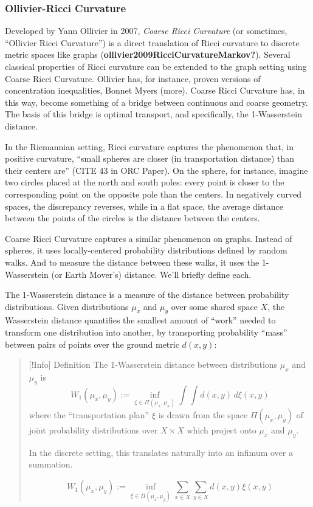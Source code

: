 \documentclass[
]{agujournal2019}
\begin{document}
\subsubsection{Ollivier-Ricci Curvature}\label{ollivier-ricci-curvature}

Developed by Yann Ollivier in 2007, \emph{Coarse Ricci Curvature} (or
sometimes, ``Ollivier Ricci Curvature'') is a direct translation of
Ricci curvature to discrete metric spaces like graphs
(\textbf{ollivier2009RicciCurvatureMarkov?}). Several classical
properties of Ricci curvature can be extended to the graph setting using
Coarse Ricci Curvature. Ollivier has, for instance, proven versions of
concentration inequalities, Bonnet Myers (more). Coarse Ricci Curvature
has, in this way, become something of a bridge between continuous and
coarse geometry. The basis of this bridge is optimal transport, and
specifically, the 1-Wasserstein distance.

In the Riemannian setting, Ricci curvature captures the phenomenon that,
in positive curvature, ``small spheres are closer (in transportation
distance) than their centers are'' (CITE 43 in ORC Paper). On the
sphere, for instance, imagine two circles placed at the north and south
poles: every point is closer to the corresponding point on the opposite
pole than the centers. In negatively curved spaces, the discrepancy
reverses, while in a flat space, the average distance between the points
of the circles is the distance between the centers.

Coarse Ricci Curvature captures a similar phenomenon on graphs. Instead
of spheres, it uses locally-centered probability distributions defined
by random walks. And to measure the distance between these walks, it
uses the 1-Wasserstein (or Earth Mover's) distance. We'll briefly define
each.

The 1-Wasserstein distance is a measure of the distance between
probability distributions. Given distributions \(\mu_{x}\) and
\(\mu_{y}\) over some shared space \(X\), the Wasserstein distance
quantifies the smallest amount of ``work'' needed to transform one
distribution into another, by transporting probability ``mass'' between
pairs of points over the ground metric \(d(x,y)\):

\begin{quote}
{[}!Info{]} Definition The 1-Wasserstein distance between distributions
\(\mu_{x}\) and \(\mu_{y}\) is
\[ W_{1}(\mu_{x},\mu_{y}) := \inf_{\xi \in \Pi(\mu_{x},\mu_{u})} \int \int d(x,y) \, d\xi(x,y) \]
where the ``transportation plan'' \(\xi\) is drawn from the space
\(\Pi(\mu_{x},\mu_{y})\) of joint probability distributions over
\(X \times X\) which project onto \(\mu_{x}\) and \(\mu_{y}\).

In the discrete setting, this translates naturally into an infimum over
a summation.

\[W_{1}(\mu_{x},\mu_{y}) := \inf_{\xi \in \Pi(\mu_{x},\mu_{y})} \sum_{x \in X} \sum_{y \in X} d(x,y) \xi(x,y)\]
\end{quote}
\end{document}
